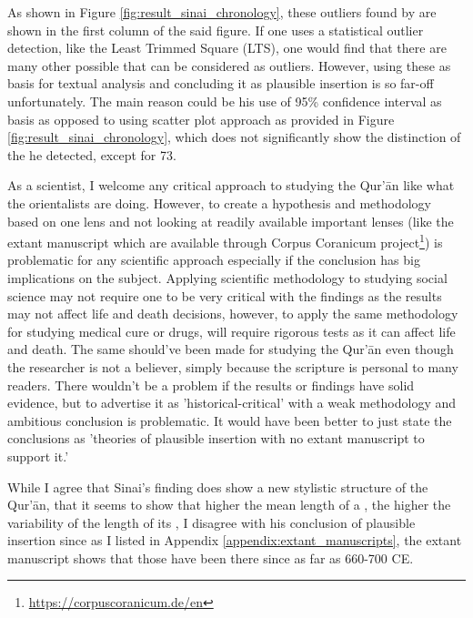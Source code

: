 As shown in Figure \ref{fig:result_sinai_chronology}, these outliers found by  are shown in the first column of the said figure. If one uses a statistical outlier detection, like the Least Trimmed Square (LTS), one would find that there are many other possible   that can be considered as outliers. However, using these as basis for textual analysis and concluding it as plausible insertion is so far-off unfortunately. The main reason could be his use of 95\% confidence interval as basis as opposed to using scatter plot approach as provided in Figure \ref{fig:result_sinai_chronology}, which does not significantly show the distinction of the   he detected, except for   73.

As a scientist, I welcome any critical approach to studying the Qur'\=an like what the orientalists are doing. However, to create a hypothesis and methodology based on one lens and not looking at readily available important lenses (like the extant manuscript which are available through Corpus Coranicum project\footnote{\url{https://corpuscoranicum.de/en}}) is problematic for any scientific approach especially if the conclusion has big implications on the subject. Applying scientific methodology to studying social science may not require one to be very critical with the findings as the results may not affect life and death decisions, however, to apply the same methodology for studying medical cure or drugs, will require rigorous tests as it can affect life and death. The same should've been made for studying the Qur'\=an even though the researcher is not a believer, simply because the scripture is personal to many readers. There wouldn't be a problem if the results or findings have solid evidence, but to advertise it as 'historical-critical' with a weak methodology and ambitious conclusion is problematic. It would have been better to just state the conclusions as 'theories of plausible insertion with no extant manuscript to support it.'

While I agree that Sinai's finding does show a new stylistic structure of the Qur'\=an, that it seems to show that higher the mean   length of a  , the higher the variability of the length of its  , I disagree with his conclusion of plausible insertion since as I listed in Appendix \ref{appendix:extant_manuscripts}, the extant manuscript shows that those   have been there since as far as 660-700 CE.

